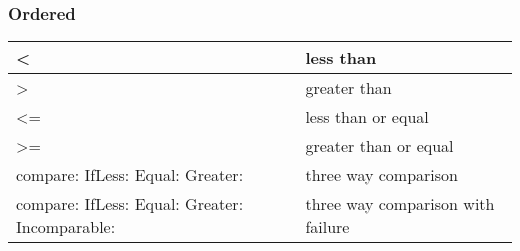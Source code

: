 \documentclass[letterpaper,10pt,english]{sphinxmanual}
\begin{document}
\subsubsection{Ordered}
\label{\detokenize{usefulselectors:ordered}}
\noindent\begin{tabulary}{\linewidth}{p{5cm} p{10cm}}
\hline

\textless{}
&
less than
\\
\hline
\textgreater{}
&
greater than
\\
\hline
\textless{}=
&
less than or equal
\\
\hline
\textgreater{}=
&
greater than or equal
\\
\hline
compare: IfLess: Equal: Greater:
&
three way comparison
\\
\hline
compare: IfLess: Equal: Greater: Incomparable:
&
three way comparison with failure
\\
\hline\end{tabulary}
\end{document}
